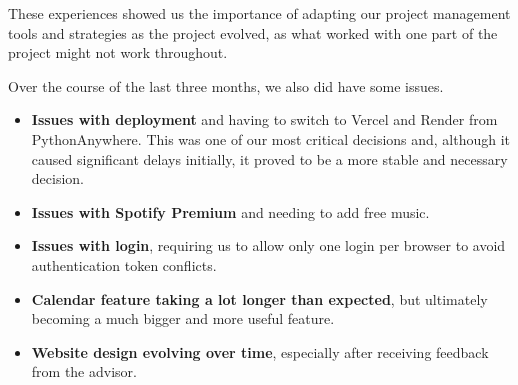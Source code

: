 These experiences showed us the importance of adapting our project management tools and strategies as the project evolved, as what worked with one part of the project might not work throughout.

Over the course of the last three months, we also did have some issues.

\begin{itemize}
    \item \textbf{Issues with deployment} and having to switch to Vercel and Render from PythonAnywhere. This was one of our most critical decisions and, although it caused significant delays initially, it proved to be a more stable and necessary decision.
    \item \textbf{Issues with Spotify Premium} and needing to add free music.
    \item \textbf{Issues with login}, requiring us to allow only one login per browser to avoid authentication token conflicts.
    \item \textbf{Calendar feature taking a lot longer than expected}, but ultimately becoming a much bigger and more useful feature.
    \item \textbf{Website design evolving over time}, especially after receiving feedback from the advisor.
\end{itemize}